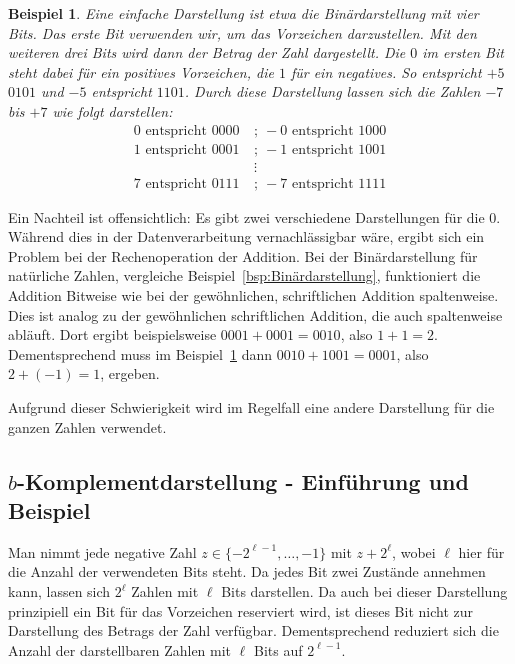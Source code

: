\documentclass{article}
\newtheorem{beispiel}[satz]{Beispiel}
\begin{document}
  \begin{beispiel} \label{bsp:Binärdarstellung_Vorzeichen}
    Eine einfache Darstellung ist etwa die Binärdarstellung mit vier Bits.
    Das erste Bit verwenden wir, um das Vorzeichen darzustellen.
    Mit den weiteren drei Bits wird dann der Betrag der Zahl dargestellt.
    Die $0$ im ersten Bit steht dabei für ein positives Vorzeichen, die $1$ für ein negatives.
    So entspricht $+5$ $0101$ und $-5$ entspricht $1101$.
    Durch diese Darstellung lassen sich die Zahlen $-7$ bis $+7$ wie folgt darstellen:
    \begin{align*}
      0 \text{ entspricht } 0000  ~&;~  -0 \text{ entspricht } 1000 \\
      1 \text{ entspricht } 0001  ~&;~  -1 \text{ entspricht } 1001 \\
      & \vdots \\
      7 \text{ entspricht } 0111  ~&;~  -7 \text{ entspricht } 1111
    \end{align*}
  \end{beispiel}

  \vspace{\baselineskip}
  
  Ein Nachteil ist offensichtlich: Es gibt zwei verschiedene Darstellungen für die $0$.
  Während dies in der Datenverarbeitung vernachlässigbar wäre, ergibt sich ein Problem bei der Rechenoperation der Addition.
  Bei der Binärdarstellung für natürliche Zahlen, vergleiche Beispiel~\ref{bsp:Binärdarstellung}, funktioniert die Addition Bitweise wie bei der gewöhnlichen, schriftlichen Addition spaltenweise.
  Dies ist analog zu der gewöhnlichen schriftlichen Addition, die auch spaltenweise abläuft.
  Dort ergibt beispielsweise $0001 + 0001 = 0010$, also $1+1=2$. 
  Dementsprechend muss im Beispiel~\ref{bsp:Binärdarstellung_Vorzeichen} dann $0010+1001=0001$, also $2+(-1)=1$, ergeben.

  \vspace{\baselineskip}

  Aufgrund dieser Schwierigkeit wird im Regelfall eine andere Darstellung für die ganzen Zahlen verwendet.

  \subsection{$b$-Komplementdarstellung - Einführung und Beispiel}

    Man nimmt jede negative Zahl $z\in \{-2^{\ell-1},\dots,-1\}$ mit $z+2^\ell$, wobei $\ell$ hier für die Anzahl der verwendeten Bits steht. 
    Da jedes Bit zwei Zustände annehmen kann, lassen sich $2^\ell$ Zahlen mit $\ell$ Bits darstellen.
    Da auch bei dieser Darstellung prinzipiell ein Bit für das Vorzeichen reserviert wird, ist dieses Bit nicht zur Darstellung des Betrags der Zahl verfügbar.
    Dementsprechend reduziert sich die Anzahl der darstellbaren Zahlen mit $\ell$ Bits auf $2^{\ell-1}$.
\end{document}

